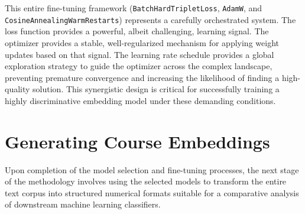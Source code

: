 This entire fine-tuning framework (\verb|BatchHardTripletLoss|, \verb|AdamW|, and \verb|CosineAnnealingWarmRestarts|) represents a carefully orchestrated system. The loss function provides a powerful, albeit challenging, learning signal. The optimizer provides a stable, well-regularized mechanism for applying weight updates based on that signal. The learning rate schedule provides a global exploration strategy to guide the optimizer across the complex landscape, preventing premature convergence and increasing the likelihood of finding a high-quality solution. This synergistic design is critical for successfully training a highly discriminative embedding model under these demanding conditions.

\section{Generating Course Embeddings}
Upon completion of the model selection and fine-tuning processes, the next stage of the methodology involves using the selected models to transform the entire text corpus into structured numerical formats suitable for a comparative analysis of downstream machine learning classifiers.

